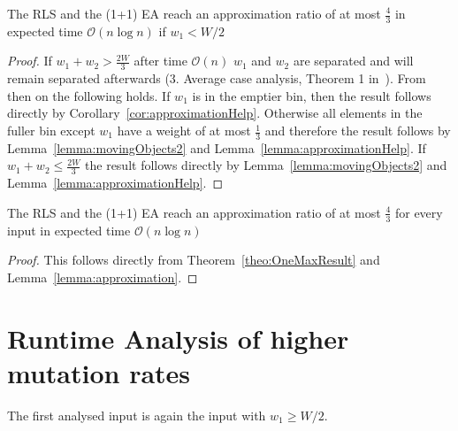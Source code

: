 \begin{lemma}\label{lemma:approximation}
    The RLS and the (1+1) EA reach an approximation ratio of at most $\frac{4}{3}$ in expected time $\mathcal{O}(n\log{}n)$ if $w_1 < W/2$
\end{lemma}
\begin{proof}
    If \(w_1+w_2 > \frac{2W}{3}\) after time $\mathcal{O}(n)$ $w_1$ and $w_2$ are separated and will remain separated afterwards (3. Average case analysis, Theorem 1 in~\cite{witt2005worst}).
    From then on the following holds.
    If $w_1$ is in the emptier bin, then the result follows directly by Corollary~\ref{cor:approximationHelp}.
    Otherwise all elements in the fuller bin except $w_1$ have a weight of at most $\frac{1}{3}$ and therefore the result follows by Lemma~\ref{lemma:movingObjects2} and Lemma~\ref{lemma:approximationHelp}.
    If \(w_1+w_2 \le \frac{2W}{3}\) the result follows directly by Lemma~\ref{lemma:movingObjects2} and Lemma~\ref{lemma:approximationHelp}.
\end{proof}

\begin{corollary}
    The RLS and the (1+1) EA reach an approximation ratio of at most $\frac{4}{3}$ for every input in expected time $\mathcal{O}(n\log{}n)$
\end{corollary}
\begin{proof}
    This follows directly from Theorem~\ref{theo:OneMaxResult} and Lemma~\ref{lemma:approximation}.
\end{proof}

\section{Runtime Analysis of higher mutation rates}

The first analysed input is again the input with $w_1\ge W/2$.

